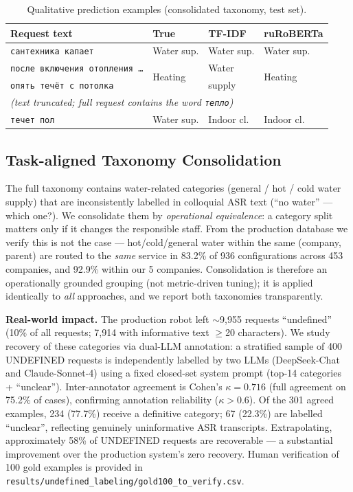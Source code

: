 \documentclass[11pt]{article}
\begin{document}
\begin{table}[h]\centering
\small
\caption{Qualitative prediction examples (consolidated taxonomy, test set).}
\label{tab:qual}
\begin{tabular}{p{4.8cm}p{1.6cm}p{1.6cm}p{1.6cm}}
\toprule
Request text & True & TF-IDF & ruRoBERTa \\
\midrule
\texttt{сантехника капает} &
  Water sup. & Water sup. & Water sup. \\
\midrule
\texttt{после включения отопления \ldots} &
  \multirow{2}{*}{Heating} & Water & \multirow{2}{*}{Heating} \\
\texttt{опять течёт с потолка} & & supply & \\
\multicolumn{4}{l}{\scriptsize\textit{(text truncated; full request contains the word \texttt{тепло})}} \\
\midrule
\texttt{течет пол} &
  Water sup. & Indoor cl. & Indoor cl. \\
\bottomrule
\end{tabular}
\end{table}

\subsection{Task-aligned Taxonomy Consolidation}
\label{sec:consol}
The full taxonomy contains water-related categories (general / hot / cold
water supply) that are inconsistently labelled in colloquial ASR text
(``no water'' --- which one?). We consolidate them by \emph{operational
equivalence}: a category split matters only if it changes the responsible
staff. From the production database we verify this is not the case ---
hot/cold/general water within the same (company, parent) are routed to the
\emph{same} service in 83.2\% of 936 configurations across 453 companies, and
92.9\% within our 5 companies. Consolidation is therefore an operationally
grounded grouping (not metric-driven tuning); it is applied identically to
\emph{all} approaches, and we report both taxonomies transparently.

\textbf{Real-world impact.} The production robot left $\sim$9{,}955 requests
``undefined'' (10\% of all requests; 7{,}914 with informative text $\geq$20
characters). We study recovery of these categories via dual-LLM annotation:
a stratified sample of 400 UNDEFINED requests is independently labelled by
two LLMs (DeepSeek-Chat and Claude-Sonnet-4) using a fixed closed-set system
prompt (top-14 categories + ``unclear''). Inter-annotator agreement is
Cohen's $\kappa = 0.716$ (full agreement on 75.2\% of cases),
confirming annotation reliability ($\kappa > 0.6$). Of the 301 agreed
examples, 234 (77.7\%) receive a definitive category; 67 (22.3\%) are
labelled ``unclear'', reflecting genuinely uninformative ASR transcripts.
Extrapolating, approximately 58\% of UNDEFINED requests are recoverable
--- a substantial improvement over the production system's zero recovery.
Human verification of 100 gold examples is provided in
\texttt{results/undefined\_labeling/gold100\_to\_verify.csv}.
\end{document}
